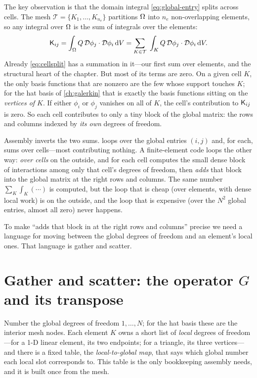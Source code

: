 The key observation is that the domain integral \cref{eq:global-entry} splits
across cells. The mesh $\mathcal{T}=\{K_1,\dots,K_{n_e}\}$ partitions $\Omega$ into
$n_e$ non-overlapping elements, so any integral over $\Omega$ is the sum of
integrals over the elements:
\begin{equation}
\mathsf{K}_{ij}=\int_\Omega Q\,\mathcal{D}\phi_j\cdot\mathcal{D}\phi_i\,\mathrm{d}V
=\sum_{K\in\mathcal{T}}\;\int_K Q\,\mathcal{D}\phi_j\cdot\mathcal{D}\phi_i\,\mathrm{d}V.
\label{eq:cellsplit}
\end{equation}
Already \cref{eq:cellsplit} has a summation in it---our first sum over elements,
and the structural heart of the chapter. But most of its terms are zero. On a
given cell $K$, the only basis functions that are nonzero are the few whose
support touches $K$; for the hat basis of \cref{ch:galerkin} that is exactly the
basis functions sitting on the \emph{vertices of $K$}. If either $\phi_i$ or
$\phi_j$ vanishes on all of $K$, the cell's contribution to $\mathsf{K}_{ij}$ is
zero. So each cell contributes to only a tiny block of the global matrix: the
rows and columns indexed by \emph{its own} degrees of freedom.

\begin{keyidea}
Assembly inverts the two sums.  loops over the global entries
$(i,j)$ and, for each, sums over cells---most contributing nothing. A
finite-element code loops the other way: \emph{over cells} on the outside, and
for each cell computes the small dense block of interactions among only that
cell's degrees of freedom, then \emph{adds} that block into the global matrix at
the right rows and columns. The same number $\sum_K\int_K(\cdots)$ is computed,
but the loop that is cheap (over elements, with dense local work) is on the
outside, and the loop that is expensive (over the $N^2$ global entries, almost
all zero) never happens.
\end{keyidea}

To make ``adds that block in at the right rows and columns'' precise we need a
language for moving between the global degrees of freedom and an element's local
ones. That language is gather and scatter.

\section{Gather and scatter: the operator \texorpdfstring{$G$}{G} and its transpose}
\label{sec:gatherscatter}

Number the global degrees of freedom $1,\dots,N$; for the hat basis these are
the interior mesh nodes. Each element $K$ owns a short list of \emph{local}
degrees of freedom---for a 1-D linear element, its two endpoints; for a triangle,
its three vertices---and there is a fixed table, the \emph{local-to-global map},
that says which global number each local slot corresponds to. This table is the
only bookkeeping assembly needs, and it is built once from the mesh.

